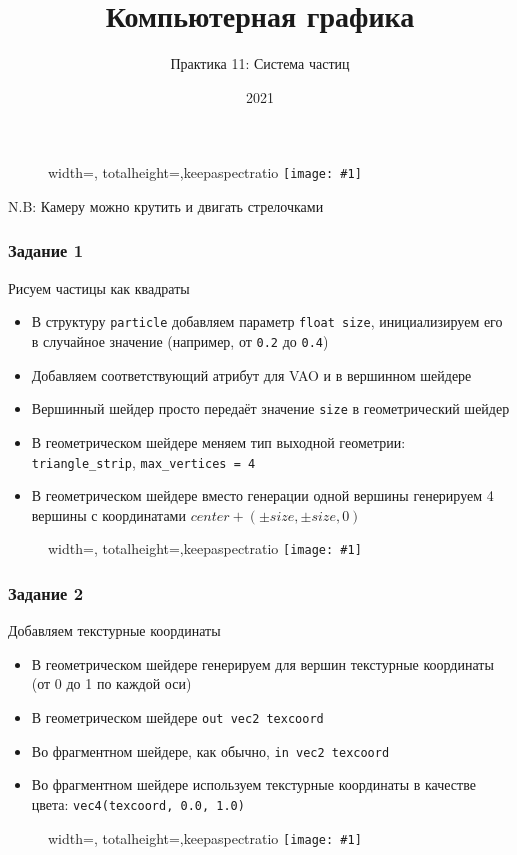 \documentclass{beamer}
\title{Компьютерная графика}
\subtitle{Практика 11: Система частиц}
\date{2021}
\newcommand{\slideimage}[1]{
  \begin{figure}
    \begin{adjustbox}{width=\textwidth, totalheight=\textheight-2\baselineskip-2\baselineskip,keepaspectratio}
      \texttt{[image: \#1]}
    \end{adjustbox}
  \end{figure}
}
\begin{document}
\frame{\titlepage}

\begin{frame}[fragile]
\slideimage{0.png}
\end{frame}

\begin{frame}[fragile]
N.B: Камеру можно крутить и двигать стрелочками
\end{frame}

\begin{frame}[fragile]
\frametitle{Задание 1}
Рисуем частицы как квадраты
\begin{itemize}
\item В структуру \verb|particle| добавляем параметр \verb|float size|, инициализируем его в случайное значение (например, от \verb|0.2| до \verb|0.4|)
\item Добавляем соответствующий атрибут для VAO и в вершинном шейдере
\item Вершинный шейдер просто передаёт значение \verb|size| в геометрический шейдер
\item В геометрическом шейдере меняем тип выходной геометрии: \verb|triangle_strip|, \verb|max_vertices = 4|
\item В геометрическом шейдере вместо генерации одной вершины генерируем 4 вершины с координатами \begin{math}center + (\pm size, \pm size, 0)\end{math}
\end{itemize}
\end{frame}

\begin{frame}[fragile]
\slideimage{1.png}
\end{frame}

\begin{frame}[fragile]
\frametitle{Задание 2}
Добавляем текстурные координаты
\begin{itemize}
\item В геометрическом шейдере генерируем для вершин текстурные координаты (от 0 до 1 по каждой оси)
\item В геометрическом шейдере \verb|out vec2 texcoord|
\item Во фрагментном шейдере, как обычно, \verb|in vec2 texcoord|
\item Во фрагментном шейдере используем текстурные координаты в качестве цвета: \verb|vec4(texcoord, 0.0, 1.0)|
\end{itemize}
\end{frame}

\begin{frame}[fragile]
\slideimage{2.png}
\end{frame}
\end{document}
